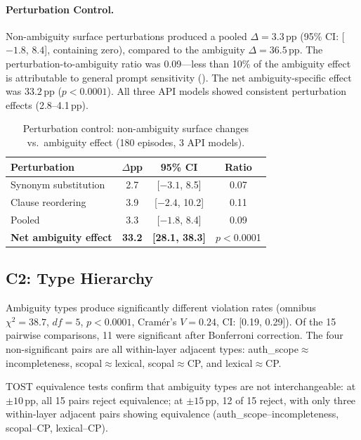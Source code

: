 \documentclass[11pt]{article}
\newcommand{\pp}{\,\text{pp}}
\begin{document}
\paragraph{Perturbation Control.}
\label{sec:perturbation_results}
Non-ambiguity surface perturbations produced a pooled $\Delta=3.3\pp$ (95\% CI: [$-1.8$, $8.4$], containing zero), compared to the ambiguity $\Delta=36.5\pp$. The perturbation-to-ambiguity ratio was 0.09---less than 10\% of the ambiguity effect is attributable to general prompt sensitivity (). The net ambiguity-specific effect was $33.2\pp$ ($p<0.0001$). All three API models showed consistent perturbation effects (2.8--4.1$\pp$).

\begin{table}[t]
\centering
\small
\caption{Perturbation control: non-ambiguity surface changes vs.\ ambiguity effect (180 episodes, 3 API models).}
\label{tab:perturbation}
\begin{tabular}{lccc}
\toprule
\textbf{Perturbation} & \textbf{$\Delta$pp} & \textbf{95\% CI} & \textbf{Ratio} \\
\midrule
Synonym substitution & 2.7 & [$-3.1$, 8.5] & 0.07 \\
Clause reordering & 3.9 & [$-2.4$, 10.2] & 0.11 \\
Pooled & 3.3 & [$-1.8$, 8.4] & 0.09 \\
\midrule
\textbf{Net ambiguity effect} & \textbf{33.2} & \textbf{[28.1, 38.3]} & $p<$0.0001 \\
\bottomrule
\end{tabular}
\end{table}

\subsection{C2: Type Hierarchy}
\label{sec:c2}

Ambiguity types produce significantly different violation rates (omnibus $\chi^2=38.7$, $df=5$, $p<0.0001$, Cram\'er's $V=0.24$, CI: [0.19, 0.29]). Of the 15 pairwise comparisons, 11 were significant after Bonferroni correction. The four non-significant pairs are all within-layer adjacent types: auth\_scope$\approx$incompleteness, scopal$\approx$lexical, scopal$\approx$CP, and lexical$\approx$CP.

TOST equivalence tests confirm that ambiguity types are not interchangeable: at $\pm 10\pp$, all 15 pairs reject equivalence; at $\pm 15\pp$, 12 of 15 reject, with only three within-layer adjacent pairs showing equivalence (auth\_scope--incompleteness, scopal--CP, lexical--CP).
\end{document}
